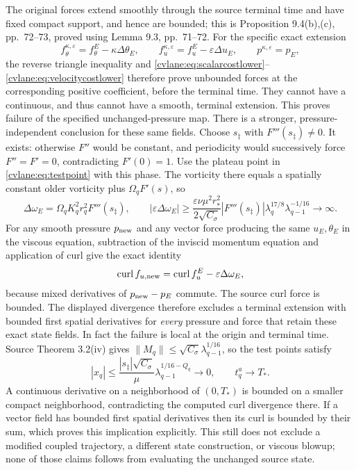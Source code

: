 The original forces extend smoothly through the source terminal
time and have fixed compact support, and hence are bounded;
this is Proposition 9.4(b),(c), pp.~72--73, proved using
Lemma 9.3, pp.~71--72.
For the specific exact extension
\[
 f_\theta^{\kappa,\varepsilon}=f_\theta^E-\kappa\Delta\theta_E,
 \qquad f_u^{\kappa,\varepsilon}=f_u^E-\varepsilon\Delta u_E,
 \qquad p^{\kappa,\varepsilon}=p_E,
\]
the reverse triangle inequality and
\eqref{cvlane:eq:scalarcostlower}--\eqref{cvlane:eq:velocitycostlower}
therefore prove unbounded forces at the corresponding positive
coefficient, before the terminal time. They cannot have a
continuous, and thus cannot have a smooth, terminal extension.
This proves failure of the specified unchanged-pressure map.
There is a stronger, pressure-independent conclusion for these
same fields. Choose $s_\ddagger$ with $F'''(s_\ddagger)\ne0$.
It exists: otherwise $F''$ would be constant, and periodicity
would successively force $F''=F'=0$, contradicting $F'(0)=1$.
Use the plateau point in \eqref{cvlane:eq:testpoint} with this phase.
The vorticity there equals a spatially constant older vorticity
plus $\Omega_qF'(s)$, so
\[
 \Delta\omega_E=\Omega_qK_q^2r_q^2F'''(s_\ddagger),\qquad
 |\varepsilon\Delta\omega_E|
 \geq\frac{\varepsilon\nu\mu^2r_*^2}{2\sqrt{C_\sigma}}
 |F'''(s_\ddagger)|\lambda_q^{17/8}
 \lambda_{q-1}^{-1/16}\longrightarrow\infty.
\]
For any smooth pressure $p_{\rm new}$ and any vector force
producing the same $u_E,\theta_E$ in the viscous equation,
subtraction of the inviscid momentum equation and application
of curl give the exact identity
\[
 \operatorname{curl}f_{u,\rm new}
 =\operatorname{curl}f_u^E-\varepsilon\Delta\omega_E,
\]
because mixed derivatives of $p_{\rm new}-p_E$ commute.
The source curl force is bounded. The displayed divergence
therefore excludes a terminal extension with bounded first
spatial derivatives for \emph{every} pressure and force that
retain these exact state fields. In fact the failure is local
at the origin and terminal time. Source Theorem 3.2(iv) gives
$\|M_q\|\leq\sqrt{C_\sigma}\lambda_{q-1}^{1/16}$, so the
test points satisfy
\[
 |x_q|\leq\frac{|s_\ddagger|\sqrt{C_\sigma}}\mu
 \lambda_{q-1}^{1/16-Q_q}\longrightarrow0,
 \qquad t_q^a\longrightarrow T_*.
\]
A continuous derivative on a neighborhood of $(0,T_*)$ is
bounded on a smaller compact neighborhood, contradicting the
computed curl divergence there. If a vector field has bounded
first spatial derivatives then its curl is bounded by their
sum, which proves this implication explicitly. This still
does not exclude a modified coupled trajectory, a different
state construction, or viscous blowup; none of those claims
follows from evaluating the unchanged source state.

